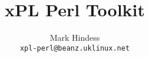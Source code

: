 \documentclass[12pt,a4paper]{article}
\title{xPL Perl Toolkit}
\author{Mark Hindess\\\texttt{xpl-perl@beanz.uklinux.net}}
\begin{document}
\newcommand{\comment}[1]{}
\setlength{\parindent}{0pt}
\addtolength{\parskip}{5pt}

\def\href#1#2{\special{html:<a href="#1">}{#2}\special{html:</a>}}
\def\url#1{\special{html:<a href="#1">}{\tt{#1}}\special{html:</a>}}
\def\msg#1{\texttt{#1}}
\def\method#1{\texttt{#1}}
\def\field#1{\texttt{#1}}
\def\cmd#1{\texttt{#1}}

\maketitle
\newpage
\tableofcontents
\end{document}
